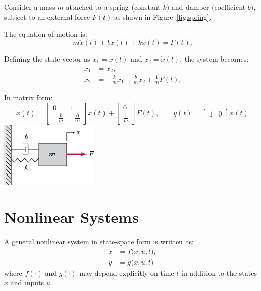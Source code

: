 \begin{example}
    Consider a mass $m$ attached to a spring (constant $k$) and damper (coefficient $b$), 
    subject to an external force $F(t)$ as shown in Figure~\ref{fig:spring}.
    
The equation of motion is:
\begin{equation}
        m\ddot{x}(t) + b\dot{x}(t) + kx(t) = F(t).
\end{equation}

Defining the state vector as $x_1 = x(t)$ and $x_2 = \dot{x}(t)$, the system becomes:
\begin{align}
    \dot{x}_1 &= x_2, \\
    \dot{x}_2 &= -\tfrac{k}{m}x_1 - \tfrac{b}{m}x_2 + \tfrac{1}{m}F(t).
\end{align}

In matrix form:
\begin{equation}
\boxed{
\dot{x}(t) =
\begin{bmatrix}
0 & 1 \\
-\tfrac{k}{m} & -\tfrac{b}{m}
\end{bmatrix} x(t) +
\begin{bmatrix}
0 \\ \tfrac{1}{m}
\end{bmatrix} F(t),
\qquad
y(t) =
\begin{bmatrix}
1 & 0
\end{bmatrix} x(t)
}
\end{equation}
    \centering
    \includegraphics[width=0.35\textwidth]{Images/nonlinear/introduction/mass_spring_damper.jpg}
    \label{fig:spring}
\end{example}

\section{Nonlinear Systems}
\begin{definition}
A general nonlinear system in state-space form is written as:
\begin{align}
    \dot{x} &= f\big(x,u,t\big), \\
    y &= g\big(x,u,t\big)
\end{align}
where $f(\cdot)$ and $g(\cdot)$ may depend explicitly on time $t$ in addition to the states $x$ and inputs $u$.
\end{definition}

